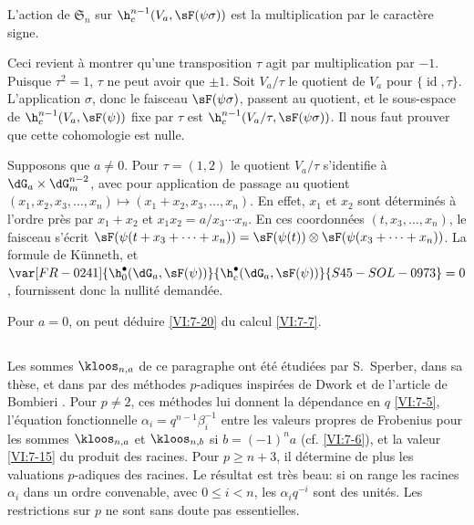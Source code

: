 \begin{proposition_}\label{VI:7-20}
L'action de $\mathfrak{S}_n$ sur $\h_c^{n-1}(V_a,\sF(\psi\sigma))$ est la multiplication 
par le caractère signe. 
\end{proposition_}

Ceci revient à montrer qu'une transposition $\tau$ agit par multiplication 
par $-1$. Puisque $\tau^2=1$, $\tau$ ne peut avoir  que 
$\pm 1$. Soit $V_a/\tau$ le quotient de $V_a$ pour 
$\{\operatorname{id},\tau\}$. L'application $\sigma$, donc le faisceau 
$\sF(\psi\sigma)$, passent au quotient, et le sous-espace de 
$\h_c^{n-1}(V_a,\sF(\psi))$ fixe par 
$\tau$ est $\h_c^{n-1}(V_a/\tau,\sF(\psi\sigma))$. Il nous faut prouver que 
cette cohomologie est nulle. 

Supposons que $a\ne 0$. Pour $\tau=(1,2)$ le quotient $V_a/\tau$ s'identifie 
à $\dG_a\times \dG_m^{n-2}$, avec pour application de passage au quotient 
$(x_1,x_2,x_3,\dots,x_n)\mapsto (x_1+x_2,x_3,\dots,x_n)$. En effet, $x_1$ et 
$x_2$ sont déterminés 
à l'ordre près par $x_1+x_2$ et 
$x_1x_2 = a/x_3\dotsm x_n$. En ces coordonnées $(t,x_3,\dots,x_n)$, le 
faisceau s'écrit 
$\sF(\psi(t+x_3+\cdots + x_n)) = \sF(\psi(t))\otimes \sF(\psi(x_3+\cdots + x_n))$. 
La formule de K\"unneth, et $\var[FR-0241]{\h_0^\bullet(\dG_a,\sF(\psi))}{\h_c^\bullet(\dG_a,\sF(\psi))}{S45-SOL-0973} = 0$, fournissent 
donc la nullité demandée. 

Pour $a=0$, on peut déduire \ref{VI:7-20} du calcul \ref{VI:7-7}. 





\subsection{}\label{VI:7-21}

Les sommes $\kloos_{n,a}$ de ce paragraphe ont été étudiées par 
S.\ Sperber, dans sa thèse, et dans  par des méthodes 
$p$-adiques inspirées de Dwork et de l'article de Bombieri . 
Pour $p\ne 2$, ces méthodes lui donnent la dépendance en $q$ \ref{VI:7-5}, 
l'équation fonctionnelle $\alpha_i = q^{n-1} \beta_i^{-1}$ entre les 
valeurs propres de Frobenius pour les sommes $\kloos_{n,a}$ et 
$\kloos_{n,b}$ si $b=(-1)^n a$ (cf. \ref{VI:7-6}), et la valeur \ref{VI:7-15} 
du produit des racines. Pour $p\geqslant n+3$, il détermine de plus les 
valuations $p$-adiques des racines. Le résultat est très beau: si on range 
les racines $\alpha_i$ dans un ordre convenable, avec 
$0\leqslant i<n$, les $\alpha_i q^{-i}$ sont des unités. Les 
restrictions sur $p$ ne sont sans doute pas essentielles. 











